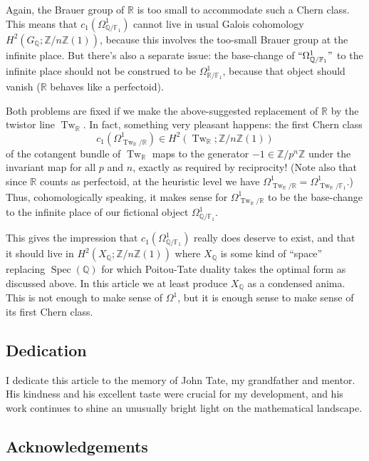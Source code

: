 \documentclass[12pt]{article}
\theoremstyle{definition}
\newcommand{\on}{\operatorname}
\newcommand{\mbb}{\mathbb}
\begin{document}
\begin{enumerate}
Again, the Brauer group of $\mbb{R}$ is too small to accommodate such a Chern class.  This means that $c_1(\Omega^1_{\mbb{Q}/\mbb{F}_1})$ cannot live in usual Galois cohomology $H^2(G_\mbb{Q};\mbb{Z}/n\mbb{Z}(1))$, because this involves the too-small Brauer group at the infinite place.  But there's also a separate issue: the base-change of $``\Omega^1_{\mbb{Q}/\mbb{F}_1}"$ to the infinite place should not be construed to be $\Omega^1_{\mbb{R}/\mbb{F}_1}$, because that object should vanish ($\mbb{R}$ behaves like a perfectoid).

Both problems are fixed if we make the above-suggested replacement of $\mbb{R}$ by the twistor line $\on{Tw}_{\mbb{R}}$.  In fact, something very pleasant happens: the first Chern class
$$c_1(\Omega^1_{\on{Tw}_{\mbb{R}}/\mbb{R}}) \in H^2(\on{Tw}_{\mbb{R}};\mbb{Z}/n\mbb{Z}(1))$$
of the cotangent bundle of $\on{Tw}_{\mbb{R}}$ maps to the generator $-1\in\mbb{Z}/p^n\mbb{Z}$ under the invariant map for all $p$ and $n$, exactly as required by reciprocity!  (Note also that since $\mbb{R}$ counts as perfectoid, at the heuristic level we have $\Omega^1_{\on{Tw}_{\mbb{R}}/\mbb{R}}=\Omega^1_{\on{Tw}_{\mbb{R}}/\mbb{F}_1}$.)  Thus, cohomologically speaking, it makes sense for $\Omega^1_{\on{Tw}_{\mbb{R}}/\mbb{R}}$ to be the base-change to the infinite place of our fictional object $\Omega^1_{\mbb{Q}/\mbb{F}_1}$.

This gives the impression that $c_1(\Omega^1_{\mbb{Q}/\mbb{F}_1})$ really does deserve to exist, and that it should live in $H^2(X_\mbb{Q};\mbb{Z}/n\mbb{Z}(1))$ where $X_\mbb{Q}$ is some kind of ``space'' replacing $\on{Spec}(\mbb{Q})$ for which Poitou-Tate duality takes the optimal form as discussed above.  In this article we at least produce $X_\mbb{Q}$ as a condensed anima.  This is not enough to make sense of $\Omega^1$, but it is enough sense to make sense of its first Chern class.
\end{enumerate}

\subsection*{Dedication}

I dedicate this article to the memory of John Tate, my grandfather and mentor.  His kindness and his excellent taste were crucial for my development, and his work continues to shine an unusually bright light on the mathematical landscape.

\subsection*{Acknowledgements}
\end{document}
